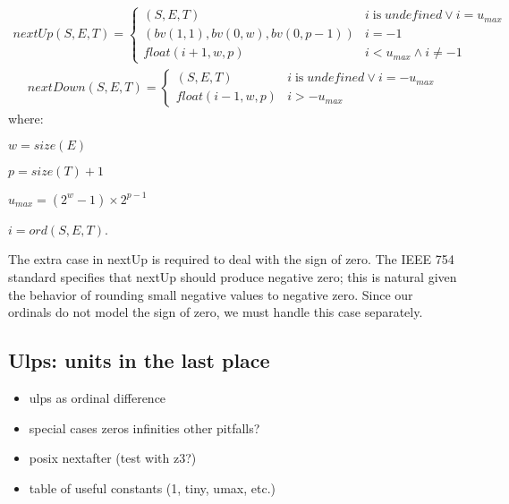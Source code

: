 \documentclass[letterpaper,10pt]{article}
\begin{document}
\begin{align} \label{eq:nextup}
 nextUp(S, E, T) = 
 \begin{cases}
  (S, E, T)                      & i \; \text{is} \; undefined \lor i = u_{max}\\
  (bv(1, 1), bv(0, w), bv(0, p-1)) & i = -1\\
  float(i+1, w, p)               & i < u_{max} \land i \not= -1
 \end{cases}
\end{align}
\begin{align} \label{eq:nextdown}
 nextDown(S, E, T) = 
 \begin{cases}
  (S, E, T)                      & i \; \text{is} \; undefined \lor i = -u_{max}\\
  float(i-1, w, p)               & i > -u_{max}
 \end{cases}
\end{align}
where:
\begin{description}
 \item $w = size(E)$
 \item $p = size(T) + 1$
 \item $u_{max} = (2^w-1) \times 2^{p-1}$
 \item $i = ord(S, E, T)$.
\end{description}

The extra case in nextUp is required to deal with the sign of zero. The IEEE 754 standard specifies that nextUp should produce negative zero; this is natural given the behavior of rounding small negative values to negative zero. Since our ordinals do not model the sign of zero, we must handle this case separately.

\subsection{Ulps: units in the last place}

\begin{itemize}
 \item ulps as ordinal difference
 \item special cases
 \subitem zeros
 \subitem infinities
 \subitem other pitfalls?
 \item posix nextafter (test with z3?)
 \item table of useful constants (1, tiny, umax, etc.)
\end{itemize}
\end{document}

